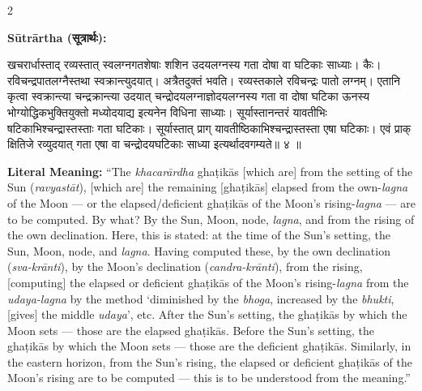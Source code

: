 \documentclass[11pt,a4paper]{article}
\newcommand{\dev}[1]{{\devanagarifont #1}}
\newenvironment{sanskritverse}{%
  \begin{center}\begin{minipage}{0.95\textwidth}
  \setlength{\leftskip}{1em}
  \setlength{\rightskip}{1em}
  \dev
}{\end{minipage}\end{center}}
\begin{document}
\begin{paracol}{2}

\noindent\textbf{Sūtrārtha (\dev{सूत्रार्थः}):}
\begin{sanskritverse}
खचरार्धास्ताद् रव्यस्तात् स्वलग्नगतशेषाः शशिन उदयलग्नस्य गता दोषा वा
घटिकाः साध्याः। कैः। रविचन्द्रपातलग्नैस्तथा स्वक्रान्त्युदयात्। अत्रैतदुक्तं भवति।
रव्यस्तकाले रविचन्द्रः पातो लग्नम्। एतानि कृत्वा स्वक्रान्त्या चन्द्रक्रान्त्या
उदयात् चन्द्रोदयलग्नाज्ञोदयलग्नस्य गता वा दोषा घटिका ऊनस्य भोग्योद्धिकभुक्तियुक्तो
मध्योदयाद्य इत्यनेन विधिना साध्याः। सूर्यास्तानन्तरं यावतीभिः षटिकाभिश्चन्द्रास्तस्ताः
गता घटिकाः। सूर्यास्तात् प्राग् यावतीष्ठिकाभिश्चन्द्रास्तस्ता एषा घटिकाः। एवं प्राक्
क्षितिजे रव्युदयात् गता एषा वा चन्द्रोदयघटिकाः साध्या इत्यर्थादवगम्यते॥ ४ ॥
\end{sanskritverse}

\switchcolumn

\textbf{Literal Meaning:} ``The \textit{khacarārdha} ghaṭikās [which are] from the setting of the Sun (\textit{ravyastāt}), [which are] the remaining [ghaṭikās] elapsed from the own-\textit{lagna} of the Moon --- or the elapsed/deficient ghaṭikās of the Moon's rising-\textit{lagna} --- are to be computed. By what? By the Sun, Moon, node, \textit{lagna}, and from the rising of the own declination. Here, this is stated: at the time of the Sun's setting, the Sun, Moon, node, and \textit{lagna}. Having computed these, by the own declination (\textit{sva-krānti}), by the Moon's declination (\textit{candra-krānti}), from the rising, [computing] the elapsed or deficient ghaṭikās of the Moon's rising-\textit{lagna} from the \textit{udaya-lagna} by the method `diminished by the \textit{bhoga}, increased by the \textit{bhukti}, [gives] the middle \textit{udaya}', etc. After the Sun's setting, the ghaṭikās by which the Moon sets --- those are the elapsed ghaṭikās. Before the Sun's setting, the ghaṭikās by which the Moon sets --- those are the deficient ghaṭikās. Similarly, in the eastern horizon, from the Sun's rising, the elapsed or deficient ghaṭikās of the Moon's rising are to be computed --- this is to be understood from the meaning.''

\end{paracol}

\vspace{0.5em}
\end{document}
